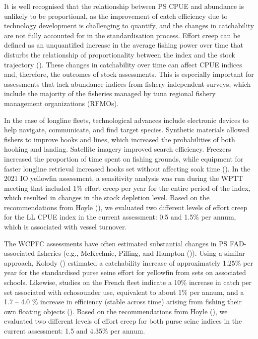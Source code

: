 \documentclass[
]{scrartcl}
\begin{document}
It is well recognised that the relationship between PS CPUE and
abundance is unlikely to be proportional, as the improvement of catch
efficiency due to technology development is challenging to quantify, and
the changes in catchability are not fully accounted for in the
standardisation process. Effort creep can be defined as an unquantified
increase in the average fishing power over time that disturbs the
relationship of proportionality between the index and the stock
trajectory ().
These changes in catchability over time can affect CPUE indices and,
therefore, the outcomes of stock assessments. This is especially
important for assessments that lack abundance indices from
fishery-independent surveys, which include the majority of the fisheries
managed by tuna regional fishery management organizations (RFMOs).

In the case of longline fleets, technological advances include
electronic devices to help navigate, communicate, and find target
species. Synthetic materials allowed fishers to improve hooks and lines,
which increased the probabilities of both hooking and landing. Satellite
imagery improved search efficiency. Freezers increased the proportion of
time spent on fishing grounds, while equipment for faster longline
retrieval increased hooks set without affecting soak time
(). In the 2021
IO yellowfin assessment, a sensitivity analysis was run during the WPTT
meeting that included 1\% effort creep per year for the entire period of
the index, which resulted in changes in the stock depletion level. Based
on the recommendations from Hoyle
(), we evaluated two
different levels of effort creep for the LL CPUE index in the current
assessment: 0.5 and 1.5\% per annum, which is associated with vessel
turnover.

The WCPFC assessments have often estimated substantial changes in PS
FAD-associated fisheries (e.g., McKechnie, Pilling, and Hampton
()). Using a
similar approach, Kolody
() estimated a
catchability increase of approximately 1.25\% per year for the
standardised purse seine effort for yellowfin from sets on associated
schools. Likewise, studies on the French fleet indicate a 10\% increase
in catch per set associated with echosounder use, equivalent to about
1\% per annum, and a 1.7 -- 4.0 \% increase in efficiency (stable across
time) arising from fishing their own floating objects
().
Based on the recommendations from Hoyle
(), we evaluated two
different levels of effort creep for both purse seine indices in the
current assessment: 1.5 and 4.35\% per annum.
\end{document}
